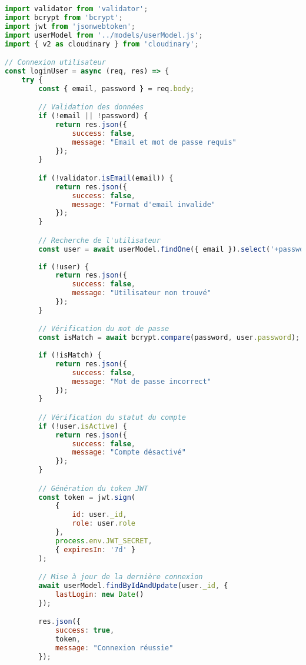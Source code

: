 \begin{lstlisting}[language=JavaScript, caption=userController.js (extrait)]
import validator from 'validator';
import bcrypt from 'bcrypt';
import jwt from 'jsonwebtoken';
import userModel from '../models/userModel.js';
import { v2 as cloudinary } from 'cloudinary';

// Connexion utilisateur
const loginUser = async (req, res) => {
    try {
        const { email, password } = req.body;

        // Validation des données
        if (!email || !password) {
            return res.json({ 
                success: false, 
                message: "Email et mot de passe requis" 
            });
        }

        if (!validator.isEmail(email)) {
            return res.json({ 
                success: false, 
                message: "Format d'email invalide" 
            });
        }

        // Recherche de l'utilisateur
        const user = await userModel.findOne({ email }).select('+password');
        
        if (!user) {
            return res.json({ 
                success: false, 
                message: "Utilisateur non trouvé" 
            });
        }

        // Vérification du mot de passe
        const isMatch = await bcrypt.compare(password, user.password);
        
        if (!isMatch) {
            return res.json({ 
                success: false, 
                message: "Mot de passe incorrect" 
            });
        }

        // Vérification du statut du compte
        if (!user.isActive) {
            return res.json({ 
                success: false, 
                message: "Compte désactivé" 
            });
        }

        // Génération du token JWT
        const token = jwt.sign(
            { 
                id: user._id,
                role: user.role 
            }, 
            process.env.JWT_SECRET,
            { expiresIn: '7d' }
        );

        // Mise à jour de la dernière connexion
        await userModel.findByIdAndUpdate(user._id, { 
            lastLogin: new Date() 
        });

        res.json({ 
            success: true, 
            token,
            message: "Connexion réussie"
        });


\end{lstlisting}

